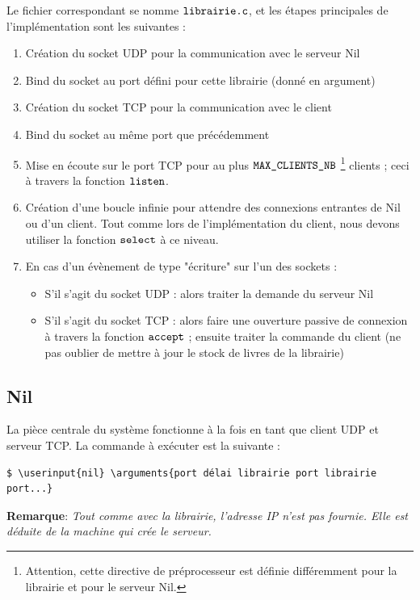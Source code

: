 \documentclass[
  french,
  twocolumn,
	9pt, %
]{fphw}
\newcommand\userinput[1]{\textbf{#1}}
\newcommand\arguments[1]{\textit{#1}}
\begin{document}
\noindent Le fichier correspondant se nomme $\verb|librairie.c|$, et les étapes principales de l'implémentation sont les suivantes :
\begin{enumerate}
  \item Création du socket UDP pour la communication avec le serveur Nil
  \item Bind du socket au port défini pour cette librairie (donné en argument)
  \item Création du socket TCP pour la communication avec le client
  \item Bind du socket au même port que précédemment
  \item Mise en écoute sur le port TCP pour au plus $\verb|MAX_CLIENTS_NB|$ \footnote{Attention, cette directive de préprocesseur est définie différemment pour la librairie et pour le serveur Nil.} clients ; ceci à travers la fonction $\verb|listen|$.
  \item Création d'une boucle infinie pour attendre des connexions entrantes de Nil ou d'un client. Tout comme lors de l'implémentation du client, nous devons utiliser la fonction $\verb|select|$ à ce niveau.
  \item En cas d'un évènement de type "écriture" sur l'un des sockets :
  \begin{itemize}
    \item S'il s'agit du socket UDP : alors traiter la demande du serveur Nil
    \item S'il s'agit du socket TCP : alors faire une ouverture passive de connexion à travers la fonction $\verb|accept|$ ; ensuite traiter la commande du client (ne pas oublier de mettre à jour le stock de livres de la librairie)
  \end{itemize}
\end{enumerate}

\subsection{Nil}
\label{sec:subnil}

La pièce centrale du système fonctionne à la fois en tant que client UDP et serveur TCP. La commande à exécuter est la suivante :
\begin{Verbatim}[commandchars=\\\{\}]
$ \userinput{nil} \arguments{port délai librairie port librairie port...}
\end{Verbatim}
\textbf{Remarque}: \textit{Tout comme avec la librairie, l'adresse IP n'est pas fournie. Elle est déduite de la machine qui crée le serveur.}
\\
\end{document}
